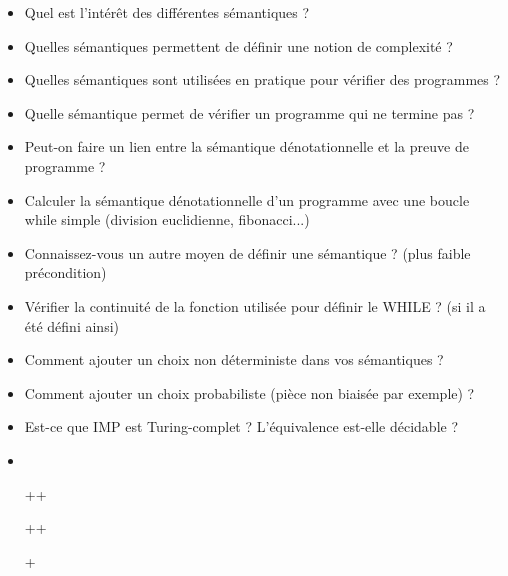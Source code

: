 \documentclass{agregfiche}
\begin{document}
\begin{itemize}
    \item Quel est l'intérêt des différentes sémantiques ?
    \item Quelles sémantiques permettent de définir une notion de complexité ?
%
    \item Quelles sémantiques sont utilisées en pratique pour vérifier des programmes ?

    \item Quelle sémantique permet de vérifier un programme qui ne termine pas ?

    \item Peut-on faire un lien entre la sémantique dénotationnelle
        et la preuve de programme ?

    \item Calculer la sémantique dénotationnelle d'un programme
        avec une boucle while simple (division euclidienne, fibonacci...)
%
    \item Connaissez-vous un autre moyen de définir une sémantique ?
        (plus faible précondition)
    \item Vérifier la continuité de la fonction utilisée pour définir le WHILE ? (si il a été défini ainsi)
    \item Comment ajouter un choix non déterministe dans
        vos sémantiques ?
    \item Comment ajouter un choix probabiliste (pièce non biaisée par exemple)
        ?
        \item Est-ce que IMP est Turing-complet ? L'équivalence est-elle décidable ?
\end{itemize}

\secreferences

\begin{itemize}
\item 
\end{itemize}

\secdev

\begin{itemize}
\item[++]  

\item[++]  

\item[+]   


\end{itemize}
\end{document}
